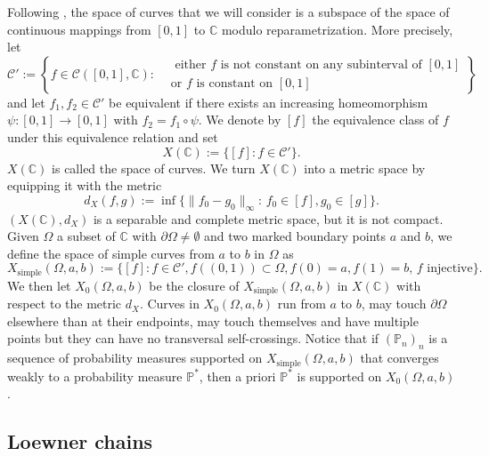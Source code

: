 \documentclass{article}
\newcommand{\PP}{{\mathbb{P}}}
\theoremstyle{definition}
\theoremstyle{remark}
\theoremstyle{remark}
\begin{document}
Following \cite{Smirnov}, the space of curves that we will consider is a subspace of the space of continuous mappings from $[0,1]$ to $\mathbb{C}$ modulo reparametrization. More precisely, let
\begin{equation*}
    \mathcal{C}':= \left \{
    f \in \mathcal{C}([0,1], \mathbb{C}): 
    \begin{aligned}
    &\text{ either $f$ is not constant on any subinterval of $[0,1]$} \\ &\text{or $f$ is constant on $[0,1]$} 
    \end{aligned}
    \right \}
\end{equation*}
and let $f_1, f_2 \in \mathcal{C}'$ be equivalent if there exists an increasing homeomorphism $\psi: [0,1] \to [0,1]$ with $f_2 = f_1 \circ \psi$. We denote by $[f]$ the equivalence class of $f$ under this equivalence relation and set
\begin{equation*}
    X(\mathbb{C}):= \{ [f]: f \in \mathcal{C}'\}.
\end{equation*}
$X(\mathbb{C})$ is called the space of curves. We turn $X(\mathbb{C})$ into a metric space by equipping it with the metric
\begin{equation*}
    d_X(f,g) := \inf \{ \| f_0 - g_0 \|_{\infty}: \, f_0 \in [f], g_0 \in [g] \}.
\end{equation*}
$(X(\mathbb{C}), d_X)$ is a separable and complete metric space, but it is not compact. Given $\Omega$ a subset of $\mathbb{C}$ with $\partial \Omega \neq \emptyset$ and two marked boundary points $a$ and $b$, we define the space of simple curves from $a$ to $b$ in $\Omega$ as
\begin{equation*}
    X_{\text{simple}}(\Omega, a, b) := \{ [f]: f \in \mathcal{C}', f((0,1)) \subset \Omega, f(0)=a, f(1)=b, \, \text{$f$ injective} \}.
\end{equation*}
We then let $X_0(\Omega, a, b)$ be the closure of $X_{\text{simple}}(\Omega, a, b)$ in $X(\mathbb{C})$ with respect to the metric $d_X$. Curves in $X_0(\Omega, a, b)$ run from $a$ to $b$, may touch $\partial \Omega$ elsewhere than at their endpoints, may touch themselves and have multiple points but they can have no transversal self-crossings. Notice that if $(\PP_n)_n$ is a sequence of probability measures supported on $X_{\text{simple}}(\Omega, a, b)$ that converges weakly to a probability measure $\PP^{*}$, then a priori $\PP^{*}$ is supported on $X_0(\Omega, a, b)$.

\subsection{Loewner chains} \label{sec_Loewner}
\end{document}
